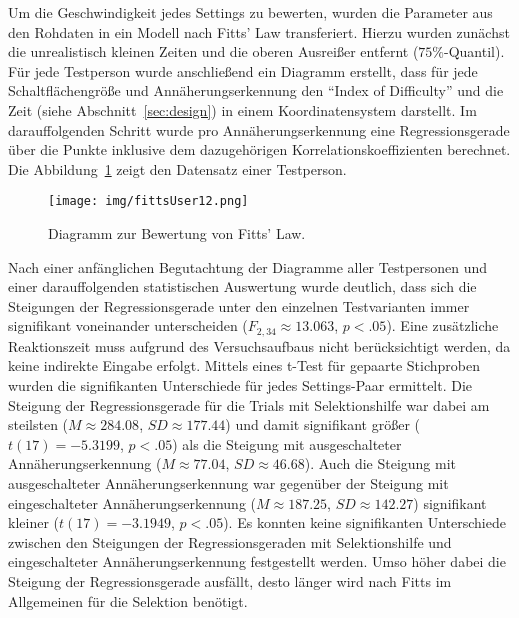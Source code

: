 \documentclass[12pt,numbers=noenddot,parskip,bibliography=totocnumbered,listof=totocnumbered]{scrreprt}
\begin{document}
Um die Geschwindigkeit jedes Settings zu bewerten, wurden die Parameter aus den Rohdaten in ein Modell nach Fitts' Law transferiert. Hierzu wurden zunächst die unrealistisch kleinen Zeiten und die oberen Ausreißer entfernt ($75\%$-Quantil). Für jede Testperson wurde anschließend ein Diagramm erstellt, dass für jede Schaltflächengröße und Annäherungserkennung den "`Index of Difficulty"' und die Zeit (siehe Abschnitt~\ref{sec:design}) in einem Koordinatensystem darstellt. Im darauffolgenden Schritt wurde pro Annäherungserkennung eine Regressionsgerade über die Punkte inklusive dem dazugehörigen Korrelationskoeffizienten berechnet. Die Abbildung~\ref{ergebnistest2fitts} zeigt den Datensatz einer Testperson.
\begin{figure}
\centering
\texttt{[image: img/fittsUser12.png]}
\caption{Diagramm zur Bewertung von Fitts' Law.}
\label{ergebnistest2fitts}
\end{figure}
Nach einer anfänglichen Begutachtung der Diagramme aller Testpersonen und einer darauffolgenden statistischen Auswertung wurde deutlich, dass sich die Steigungen der Regressionsgerade unter den einzelnen Testvarianten immer signifikant voneinander unterscheiden ($F_{2,34}\approx 13.063$, $p < .05$). Eine zusätzliche Reaktionszeit muss aufgrund des Versuchsaufbaus nicht berücksichtigt werden, da keine indirekte Eingabe erfolgt. Mittels eines t-Test für gepaarte Stichproben wurden die signifikanten Unterschiede für jedes Settings-Paar ermittelt. Die Steigung der Regressionsgerade für die Trials mit Selektionshilfe war dabei am steilsten ($M \approx 284.08$, $SD \approx 177.44$) und damit signifikant größer ($t(17) = -5.3199$, $p < .05$) als die Steigung mit ausgeschalteter Annäherungserkennung ($M \approx 77.04$, $SD \approx 46.68$). Auch die Steigung mit ausgeschalteter Annäherungserkennung war gegenüber der Steigung mit eingeschalteter Annäherungserkennung ($M \approx 187.25$, $SD \approx 142.27$) signifikant kleiner ($t(17) = -3.1949$, $p < .05$). Es konnten keine signifikanten Unterschiede zwischen den Steigungen der Regressionsgeraden mit Selektionshilfe und eingeschalteter Annäherungserkennung festgestellt werden. Umso höher dabei die Steigung der Regressionsgerade ausfällt, desto länger wird nach Fitts im Allgemeinen für die Selektion benötigt.
\end{document}
